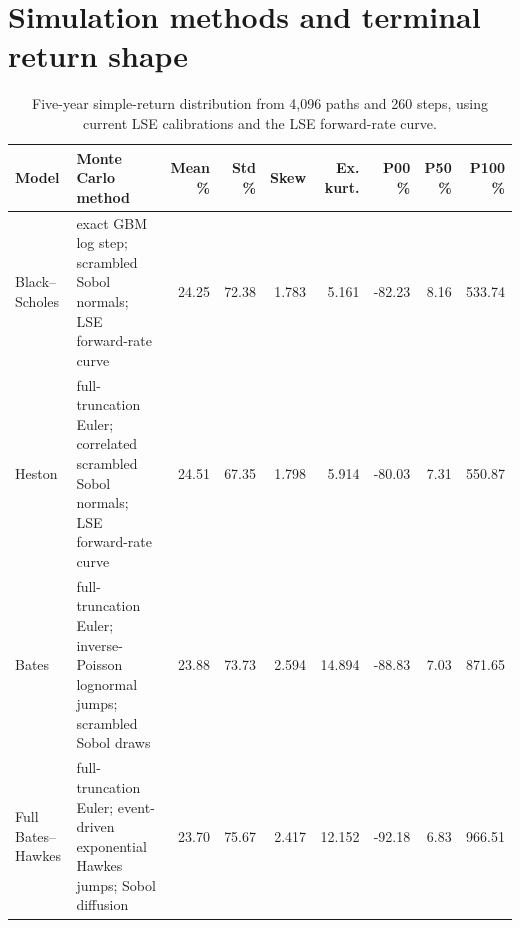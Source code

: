 \documentclass[a4paper,10pt,titlepage,oneside,openany]{book}
\theoremstyle{plain}
\theoremstyle{definition}
\theoremstyle{remark}
\begin{document}
\section*{Simulation methods and terminal return shape}
\begin{table}[H]
\centering
\fontsize{7.2}{8.2}\selectfont
\setlength{\tabcolsep}{2.2pt}
\begin{tabularx}{\textwidth}{@{}p{2.0cm}Xrrrrrrr@{}}
\toprule
Model & Monte Carlo method & Mean \% & Std \% & Skew & Ex. kurt. & P00 \% & P50 \% & P100 \% \\
\midrule
Black--Scholes & exact GBM log step; scrambled Sobol normals; LSE forward-rate curve & 24.25 & 72.38 & 1.783 & 5.161 & -82.23 & 8.16 & 533.74 \\
Heston & full-truncation Euler; correlated scrambled Sobol normals; LSE forward-rate curve & 24.51 & 67.35 & 1.798 & 5.914 & -80.03 & 7.31 & 550.87 \\
Bates & full-truncation Euler; inverse-Poisson lognormal jumps; scrambled Sobol draws & 23.88 & 73.73 & 2.594 & 14.894 & -88.83 & 7.03 & 871.65 \\
Full Bates--Hawkes & full-truncation Euler; event-driven exponential Hawkes jumps; Sobol diffusion & 23.70 & 75.67 & 2.417 & 12.152 & -92.18 & 6.83 & 966.51 \\
\bottomrule
\end{tabularx}
\caption{Five-year simple-return distribution from 4,096 paths and 260 steps, using current LSE calibrations and the LSE forward-rate curve.}
\label{tab:appendix-simulation}
\end{table}
\end{document}
